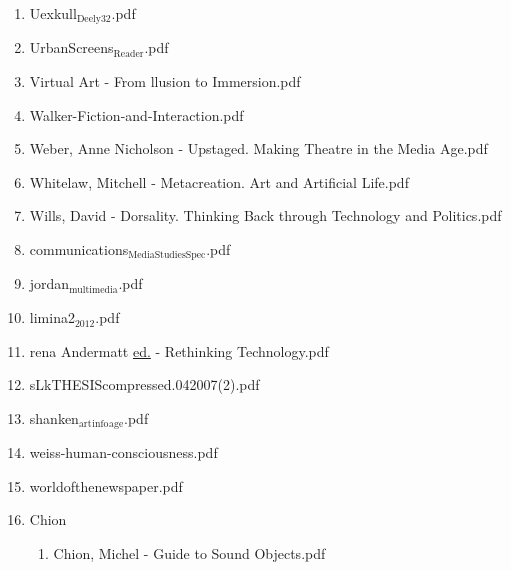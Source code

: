 \documentclass[11pt]{article}
\begin{document}
\begin{enumerate}
\item Uexkull$_{\text{Deely32}}$.pdf
\label{sec-1-1-1-1-11-24-15}

\item UrbanScreens$_{\text{Reader}}$.pdf
\label{sec-1-1-1-1-11-24-16}

\item Virtual Art - From llusion to Immersion.pdf
\label{sec-1-1-1-1-11-24-17}

\item Walker-Fiction-and-Interaction.pdf
\label{sec-1-1-1-1-11-24-18}

\item Weber, Anne Nicholson - Upstaged. Making Theatre in the Media Age.pdf
\label{sec-1-1-1-1-11-24-19}

\item Whitelaw, Mitchell - Metacreation. Art and Artificial Life.pdf
\label{sec-1-1-1-1-11-24-20}

\item Wills, David - Dorsality. Thinking Back through Technology and Politics.pdf
\label{sec-1-1-1-1-11-24-21}

\item communications$_{\text{MediaStudiesSpec}}$.pdf
\label{sec-1-1-1-1-11-24-22}

\item jordan$_{\text{multimedia}}$.pdf
\label{sec-1-1-1-1-11-24-23}

\item limina2$_{\text{2012}}$.pdf
\label{sec-1-1-1-1-11-24-24}

\item rena Andermatt \uline{ed.} - Rethinking Technology.pdf
\label{sec-1-1-1-1-11-24-25}

\item sLkTHESIScompressed.042007(2).pdf
\label{sec-1-1-1-1-11-24-26}

\item shanken$_{\text{art}}$$_{\text{info}}$$_{\text{age}}$.pdf
\label{sec-1-1-1-1-11-24-27}

\item weiss-human-consciousness.pdf
\label{sec-1-1-1-1-11-24-28}

\item worldofthenewspaper.pdf
\label{sec-1-1-1-1-11-24-29}

\item Chion
\label{sec-1-1-1-1-11-24-30}
\begin{enumerate}
\item Chion, Michel - Guide to Sound Objects.pdf
\label{sec-1-1-1-1-11-24-30-1}


\end{enumerate}
\end{enumerate}
\end{document}
